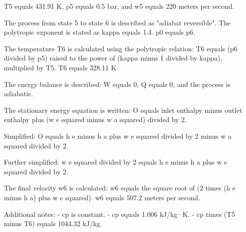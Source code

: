 T5 equals 431.91 K, p5 equals 0.5 bar, and w5 equals 220 meters per second.  

The process from state 5 to state 6 is described as "adiabat reversible".  
The polytropic exponent is stated as kappa equals 1.4.  
p0 equals p6.  

The temperature T6 is calculated using the polytropic relation:  
T6 equals (p6 divided by p5) raised to the power of (kappa minus 1 divided by kappa), multiplied by T5.  
T6 equals 328.11 K.  

The energy balance is described:  
W equals 0, Q equals 0, and the process is adiabatic.  

The stationary energy equation is written:  
O equals inlet enthalpy minus outlet enthalpy plus (w e squared minus w a squared) divided by 2.  

Simplified:  
O equals h e minus h a plus w e squared divided by 2 minus w a squared divided by 2.  

Further simplified:  
w e squared divided by 2 equals h e minus h a plus w e squared divided by 2.  

The final velocity w6 is calculated:  
w6 equals the square root of (2 times (h e minus h a) plus w e squared).  
w6 equals 507.2 meters per second.  

Additional notes:  
- cp is constant.  
- cp equals 1.006 kJ/kg·K.  
- cp times (T5 minus T6) equals 1044.32 kJ/kg.